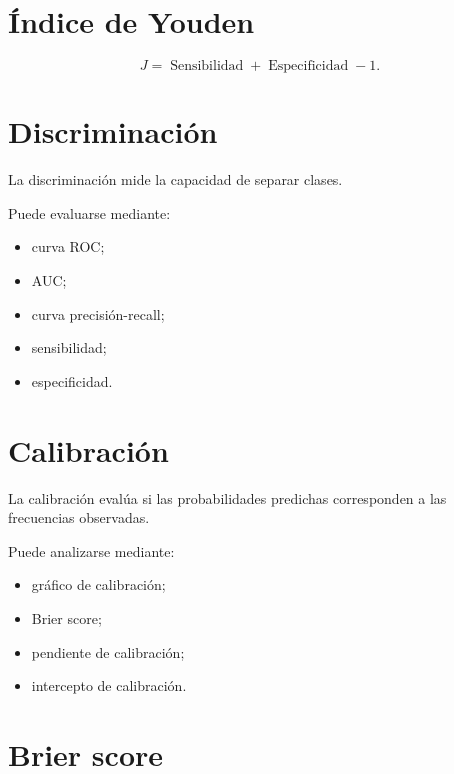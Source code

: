 \documentclass[
  spanish,
  10.5pt,
  letterpaper,
  DIV=11,
  numbers=noendperiod,
  oneside,
  open=any]{scrreprt}
\providecommand{\tightlist}{%
  \setlength{\itemsep}{0pt}\setlength{\parskip}{0pt}}
\theoremstyle{definition}
\theoremstyle{definition}
\theoremstyle{plain}
\theoremstyle{remark}
\begin{document}
\section*{Índice de Youden}\label{uxedndice-de-youden}


\[
J
=
\operatorname{Sensibilidad}
+
\operatorname{Especificidad}
-
1.
\]

\section*{Discriminación}\label{discriminaciuxf3n}


La discriminación mide la capacidad de separar clases.

Puede evaluarse mediante:

\begin{itemize}
\tightlist
\item
  curva ROC;
\item
  AUC;
\item
  curva precisión-recall;
\item
  sensibilidad;
\item
  especificidad.
\end{itemize}

\section*{Calibración}\label{calibraciuxf3n-1}


La calibración evalúa si las probabilidades predichas corresponden a las
frecuencias observadas.

Puede analizarse mediante:

\begin{itemize}
\tightlist
\item
  gráfico de calibración;
\item
  Brier score;
\item
  pendiente de calibración;
\item
  intercepto de calibración.
\end{itemize}

\section*{Brier score}\label{brier-score-1}
\end{document}
